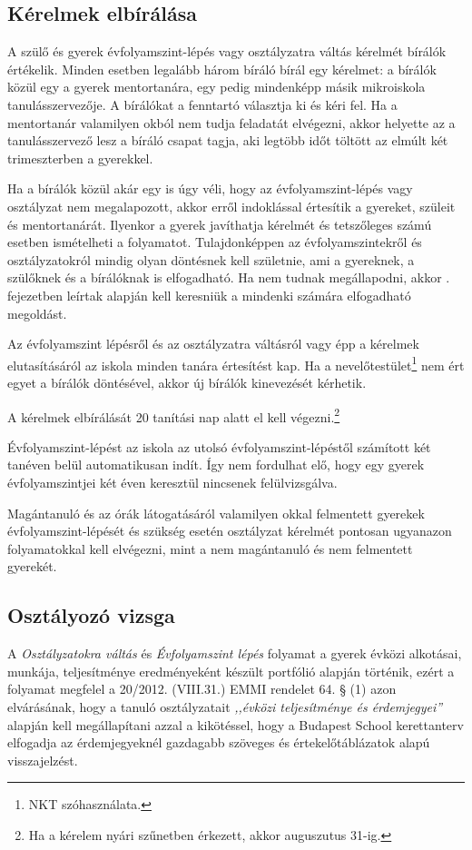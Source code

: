 
\subsection{Kérelmek elbírálása}

A szülő és gyerek évfolyamszint-lépés vagy osztályzatra váltás kérelmét bírálók értékelik. Minden esetben legalább három bíráló bírál egy kérelmet: a bírálók közül egy a gyerek mentortanára, egy pedig mindenképp másik mikroiskola tanulásszervezője. A bírálókat a fenntartó választja ki és kéri fel. Ha a mentortanár valamilyen okból nem tudja feladatát elvégezni, akkor helyette az a tanulásszervező lesz a bíráló csapat tagja, aki legtöbb időt töltött az elmúlt két trimeszterben a gyerekkel.

Ha a bírálók közül akár egy is úgy véli, hogy az évfolyamszint-lépés vagy osztályzat nem megalapozott, akkor erről indoklással értesítik a gyereket, szüleit és mentortanárát. Ilyenkor a gyerek javíthatja kérelmét és tetszőleges számú esetben ismételheti a folyamatot. Tulajdonképpen az évfolyamszintekről és osztályzatokról mindig olyan döntésnek kell születnie, ami a gyereknek, a szülőknek és a bírálóknak is elfogadható. Ha nem tudnak megállapodni, akkor . fejezetben leírtak alapján kell keresniük a mindenki számára elfogadható megoldást.

Az évfolyamszint lépésről és az osztályzatra váltásról vagy épp a kérelmek elutasításáról az iskola minden tanára értesítést kap. Ha a nevelőtestület\footnote{NKT szóhasználata.} nem ért egyet a bírálók döntésével, akkor új bírálók kinevezését kérhetik.

A kérelmek elbírálását 20 tanítási nap alatt el kell végezni.\footnote{Ha a kérelem nyári szűnetben érkezett, akkor auguszutus 31-ig.}

Évfolyamszint-lépést az iskola az utolsó évfolyamszint-lépéstől számított két tanéven belül automatikusan indít. Így nem fordulhat elő, hogy egy gyerek évfolyamszintjei két éven keresztül nincsenek felülvizsgálva.

Magántanuló és az órák látogatásáról valamilyen okkal felmentett gyerekek évfolyamszint-lépését és szükség esetén osztályzat kérelmét pontosan ugyanazon folyamatokkal kell elvégezni, mint a nem magántanuló és nem felmentett gyerekét.

\subsection{Osztályozó vizsga}
A \emph{Osztályzatokra váltás} és \emph{Évfolyamszint lépés} folyamat a gyerek évközi alkotásai, munkája, teljesítménye eredményeként készült portfólió alapján történik, ezért a folyamat megfelel a 20/2012. (VIII.31.) EMMI rendelet 64. § (1) azon elvárásának, hogy a tanuló osztályzatait \emph{,,évközi teljesítménye és érdemjegyei''} alapján kell megállapítani azzal a kikötéssel, hogy a Budapest School kerettanterv elfogadja az érdemjegyeknél gazdagabb szöveges és értekelőtáblázatok alapú visszajelzést.

